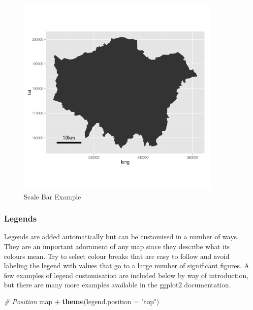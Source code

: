 \documentclass[]{article}
\newenvironment{Shaded}{}{}
\newcommand{\KeywordTok}[1]{\textcolor[rgb]{0.00,0.44,0.13}{\textbf{{#1}}}}
\newcommand{\DataTypeTok}[1]{\textcolor[rgb]{0.56,0.13,0.00}{{#1}}}
\newcommand{\StringTok}[1]{\textcolor[rgb]{0.25,0.44,0.63}{{#1}}}
\newcommand{\CommentTok}[1]{\textcolor[rgb]{0.38,0.63,0.69}{\textit{{#1}}}}
\newcommand{\NormalTok}[1]{{#1}}
\let\Oldincludegraphics\includegraphics
\renewcommand{\includegraphics}[1]{\Oldincludegraphics[width=10cm]{#1}}
\begin{document}
\begin{figure}[htbp]
\centering
\includegraphics{figure/Scale_Bar_Example.png}
\caption{Scale Bar Example}
\end{figure}

\subsubsection{Legends}

Legends are added automatically but can be customised in a number of
ways. They are an important adornment of any map since they describe
what its colours mean. Try to select colour breaks that are easy to
follow and avoid labeling the legend with values that go to a large
number of significant figures. A few examples of legend customisation
are included below by way of introduction, but there are many more
examples available in the ggplot2 documentation.

\begin{Shaded}
\begin{Highlighting}[]
\CommentTok{# Position}
\NormalTok{map + }\KeywordTok{theme}\NormalTok{(}\DataTypeTok{legend.position =} \StringTok{"top"}\NormalTok{)}
\end{Highlighting}
\end{Shaded}
\end{document}
